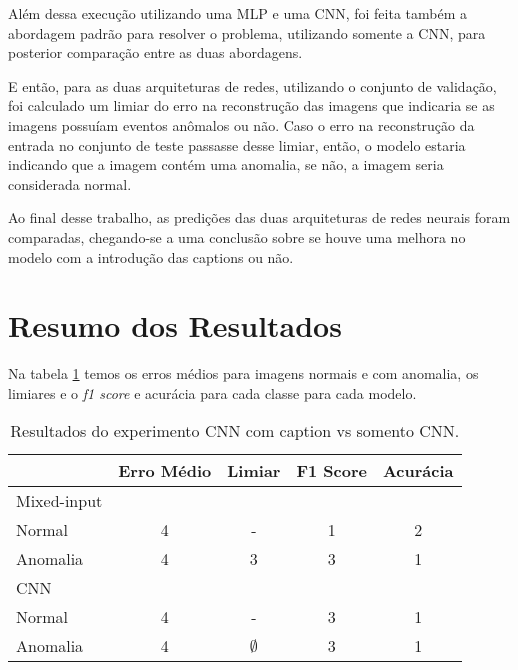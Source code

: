 Além dessa execução utilizando uma MLP e uma CNN, foi feita também a abordagem padrão para resolver o problema, utilizando somente a CNN, para posterior comparação entre as duas abordagens.

E então, para as duas arquiteturas de redes, utilizando o conjunto de validação, foi calculado um limiar do erro na reconstrução das imagens que indicaria se as imagens possuíam eventos anômalos ou não. Caso o erro na reconstrução da entrada no conjunto de teste passasse desse limiar, então, o modelo estaria indicando que a imagem contém uma anomalia, se não, a imagem seria considerada normal.

Ao final desse trabalho, as predições das duas arquiteturas de redes neurais foram comparadas, chegando-se a uma conclusão sobre se houve uma melhora no modelo com a introdução das captions ou não.

\section{Resumo dos Resultados}
Na tabela \ref{tab:RESULTADOS_MIXED_INPUT_E_CNN} temos os erros médios para imagens normais e com anomalia, os limiares e o \textit{f1 score} e acurácia para cada classe para cada modelo.

\begin{table}[!htb]
  \centering
  \label{tab:RESULTADOS_MIXED_INPUT_E_CNN}
  \begin{tabular}{l c c c c}
  \toprule
    & Erro Médio & Limiar & F1 Score & Acurácia \\
    \midrule
        Mixed-input &  &  &  & \\
        \hspace{0.5cm}Normal & 4 & - & 1 & 2\\
        \hspace{0.5cm}Anomalia & 4 & 3 & 3 & 1\\
        CNN &  &  &  &  \\
        \hspace{0.5cm}Normal & 4 & - & 3 & 1\\
        \hspace{0.5cm}Anomalia & 4 & $\emptyset$ & 3 & 1\\

    \bottomrule
  \end{tabular}
  \caption{Resultados do experimento CNN com caption vs somento CNN.}
\end{table}


